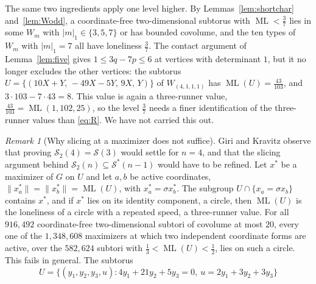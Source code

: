 \documentclass[12pt]{amsart}
\theoremstyle{definition}\newtheorem{definition}[theorem]{Definition}
\theoremstyle{remark}\newtheorem{remark}[theorem]{Remark}
\newcommand{\norm}[1]{\lVert #1\rVert}
\newcommand{\ML}{\operatorname{ML}}
\begin{document}
The same two ingredients apply one level higher. By Lemmas~\ref{lem:shortchar} and~\ref{lem:Wodd}, a coordinate-free two-dimensional subtorus with $\ML<\frac37$ lies in some $W_m$ with $|m|_1\in\{3,5,7\}$ or has bounded covolume, and the ten types of $W_m$ with $|m|_1=7$ all have loneliness $\frac37$. The contact argument of Lemma~\ref{lem:five} gives $1\le3q-7p\le6$ at vertices with determinant $1$, but it no longer excludes the other vertices: the subtorus $U=\{(10X+Y,\,-49X-5Y,\,9X,\,Y)\}$ of $W_{(4,1,1,1)}$ has $\ML(U)=\frac{43}{103}$, and $3\cdot103-7\cdot43=8$. This value is again a three-runner value, $\frac{43}{103}=\ML(1,102,25)$, so the level $\frac37$ needs a finer identification of the three-runner values than \eqref{eq:R}. We have not carried this out.

\begin{remark}[Why slicing at a maximizer does not suffice]\label{rem:slicing}
Giri and Kravitz observe that proving $\mathcal S_2(4)=\mathcal S(3)$ would settle \cite[Conjecture~1.5]{GiriKravitz} for $n=4$, and that the slicing argument behind $\mathcal S_2(n)\subseteq\mathcal S^*(n-1)$ would have to be refined. Let $x^*$ be a maximizer of $G$ on $U$ and let $a,b$ be active coordinates, $\norm{x^*_a}=\norm{x^*_b}=\ML(U)$, with $x^*_a=\sigma x^*_b$. The subgroup $U\cap\{x_a=\sigma x_b\}$ contains $x^*$, and if $x^*$ lies on its identity component, a circle, then $\ML(U)$ is the loneliness of a circle with a repeated speed, a three-runner value. For all $916{,}492$ coordinate-free two-dimensional subtori of covolume at most $20$, every one of the $1{,}348{,}608$ maximizers at which two independent coordinate forms are active, over the $582{,}624$ subtori with $\frac13<\ML(U)<\frac12$, lies on such a circle. This fails in general. The subtorus
\[
 U=\{(y_1,y_2,y_3,u):4y_1+21y_2+5y_3=0,\ u=2y_1+3y_2+3y_3\}
\]

\end{remark}
\end{document}
